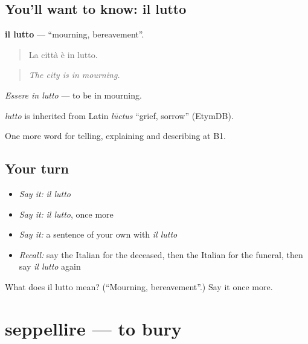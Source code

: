 \subsection*{You'll want to know: il lutto}
\textbf{il lutto} — \textquotedblleft{}mourning, bereavement\textquotedblright{}.

\begin{quote}
La città è in lutto.
\end{quote}

\begin{quote}
\emph{The city is in mourning.}
\end{quote}

\emph{Essere in lutto} — to be in mourning.

\begin{cousinweb}
\emph{lutto} is inherited from Latin \emph{lūctus} \textquotedblleft{}grief, sorrow\textquotedblright{} (EtymDB).
\end{cousinweb}

\begin{grammarlens}[title={What you've built}]
One more word for telling, explaining and describing at B1.
\end{grammarlens}

\subsection*{Your turn}
\begin{itemize}
\raggedright
  \item \emph{Say it:} \emph{il lutto}
  \item \emph{Say it:} \emph{il lutto}, once more
  \item \emph{Say it:} a sentence of your own with \emph{il lutto}
  \item \emph{Recall:} say the Italian for the deceased, then the Italian for the funeral, then say \emph{il lutto} again
\end{itemize}

\begin{tcolorbox}[breakable,colback=teal!4,colframe=teal!35!black,title={Before you move on}]
What does il lutto mean? (\textquotedblleft{}Mourning, bereavement\textquotedblright{}.) Say it once more.
\end{tcolorbox}
\section[seppellire]{seppellire — to bury}


